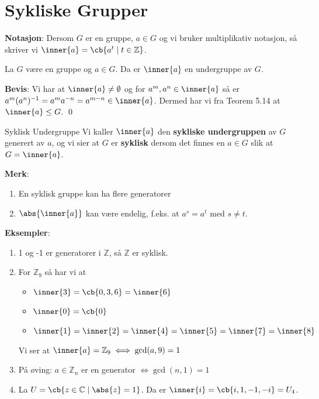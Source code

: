 \section{Sykliske Grupper}

\textbf{Notasjon}: Dersom $G$ er en gruppe, $a \in G$ og vi bruker multiplikativ
notasjon, så skriver vi $\inner{a} = \cb{a^t\mid t\in \mathbb{Z}}$.

\begin{theorem*}{5.17}{}
	La $G$ være en gruppe og $a \in G$. Da er $\inner{a}$ en undergruppe av $G$.
\end{theorem*}
\textbf{Bevis}: Vi har at $\inner{a} \neq \emptyset$ og for $a^m, a^n \in \inner{a}$
så er $a^m(a^n)^{-1} = a^ma^{-n} = a^{m-n} \in \inner{a}$. Dermed har vi fra Teorem
5.14 at $\inner{a} \leq G$. \qed

\begin{definition}{Syklisk Undergruppe}{}
	Vi kaller $\inner{a}$ den \textbf{sykliske undergruppen} av $G$ generert av $a$, og
	vi sier at $G$ er \textbf{syklisk} dersom det finnes en $a \in G$ slik at
	$G = \inner{a}$.
\end{definition}

\textbf{Merk}:
\begin{enumerate}
	\item En syklisk gruppe kan ha flere generatorer
	\item $\abs{\inner{a}}$ kan være endelig, f.eks. at $a^s = a^t$ med $s \neq t$.
\end{enumerate}

\textbf{Eksempler}:
\begin{enumerate}
	\item 1 og -1 er generatorer i $\mathbb{Z}$, så $\mathbb{Z}$ er syklisk.
	\item For $\mathbb{Z}_9$ så har vi at
	      \begin{itemize}
		      \item $\inner{3} = \cb{0, 3, 6} = \inner{6}$
		      \item $\inner{0} = \cb{0}$
		      \item $\inner{1} = \inner{2} = \inner{4} = \inner{5} = \inner{7} = \inner{8}$
	      \end{itemize}
	      Vi ser at $\inner{a} = \mathbb{Z}_9 \iff \gcd(a, 9) = 1$
	\item På øving: $a \in \mathbb{Z}_n$ er en generator $\iff \gcd (n, 1) = 1$
	\item La $U=\cb{z\in\mathbb{C}\mid \abs{z} = 1}$. Da er
	      $\inner{i} = \cb{i, 1, -1, -i} = U_4$.
\end{enumerate}

